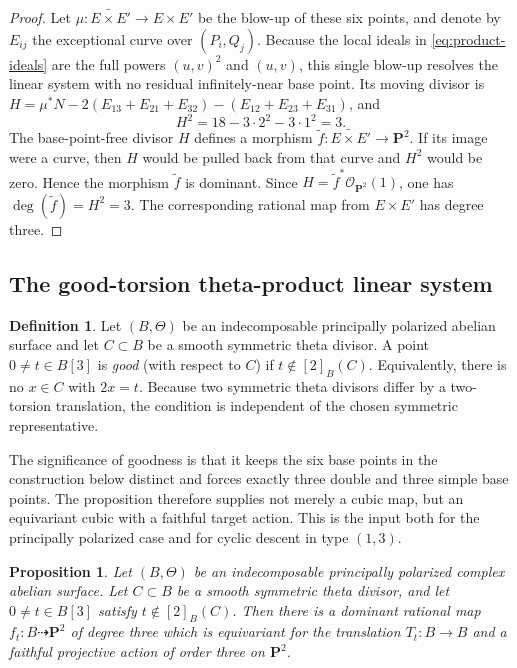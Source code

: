 \documentclass[12pt]{amsart}
\numberwithin{equation}{section}
\newtheorem{proposition}[theorem]{Proposition}
\theoremstyle{definition}
\newtheorem{definition}[theorem]{Definition}
\theoremstyle{remark}
\newcommand{\PP}{\mathbf P}
\newcommand{\cO}{\mathcal O}
\begin{document}
\begin{proof}
Let $\mu:\widetilde{E\times E'}\to E\times E'$ be the blow-up of these
six points, and denote by $E_{ij}$ the exceptional
curve over $(P_i,Q_j)$.  Because the local ideals in
\eqref{eq:product-ideals} are the full powers $(u,v)^2$ and $(u,v)$, this
single blow-up resolves the linear system with no residual infinitely-near base
point.  Its moving divisor is
$H=\mu^*N-2(E_{13}+E_{21}+E_{32})
-(E_{12}+E_{23}+E_{31})$, and
\[
  H^2=18-3\cdot2^2-3\cdot1^2=3.
\]
The base-point-free divisor $H$ defines a morphism
$\widetilde f:\widetilde{E\times E'}\to\PP^2$.
If its image were a curve, then $H$ would be pulled back from that curve
and $H^2$ would be zero.  Hence the morphism $\widetilde f$ is dominant.
Since
$H=\widetilde f^*\cO_{\PP^2}(1)$, one has
$\deg(\widetilde f)=H^2=3$.
The corresponding rational map from $E\times E'$ has degree three.
\end{proof}

\subsection{The good-torsion theta-product linear system}
\label{subsec:good-torsion}

\begin{definition}\label{def:good-torsion}
Let $(B,\Theta)$ be an indecomposable principally polarized abelian
surface and let $C\subset B$ be a smooth symmetric theta divisor.  A
point $0\ne t\in B[3]$ is \emph{good} (with respect to $C$) if
$t\notin[2]_B(C)$.  Equivalently, there is no $x\in C$ with $2x=t$.
Because two symmetric theta divisors differ by a two-torsion translation,
the condition is independent of the chosen symmetric representative.
\end{definition}

The significance of goodness is that it keeps the six base points in the
construction below distinct and forces exactly three double and three
simple base points.  The proposition therefore supplies not merely a
cubic map, but an equivariant cubic with a faithful target action.  This is
the input both for the principally polarized case and for cyclic descent
in type $(1,3)$.

\begin{proposition}\label{prop:good-theta}
Let $(B,\Theta)$ be an indecomposable principally polarized complex
abelian surface.  Let $C\subset B$ be a smooth symmetric theta divisor,
and let $0\neq t\in B[3]$ satisfy $t\notin[2]_B(C)$.  Then there is a
dominant rational map $f_t:B\dashrightarrow\PP^2$
of degree three which is equivariant for the translation
$T_t:B\to B$ and a faithful projective action of order three on $\PP^2$.
\end{proposition}
\end{document}
